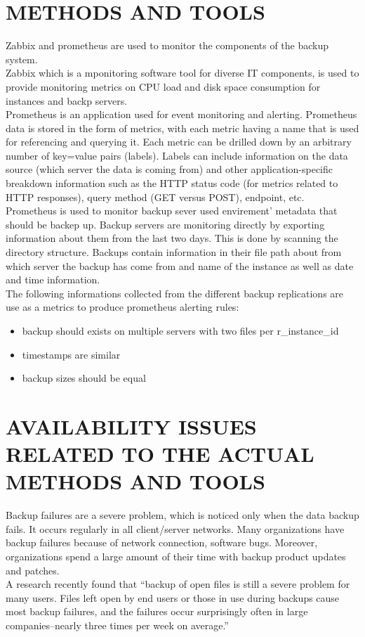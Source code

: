 \documentclass[english]{tktltiki2}
\theoremstyle{definition}
\theoremstyle{remark}
\begin{document}
\section{METHODS AND TOOLS}
Zabbix and prometheus are used to monitor the components of the backup system.\\
Zabbix \cite{10.5555/3074244} which  is a mponitoring software tool for diverse IT components,  is used to provide monitoring metrics on CPU load and disk space consumption for instances and backp servers.\\ 
Prometheus \cite{turnbull2018monitoring} is an application used for event monitoring and alerting.
Prometheus data is stored in the form of metrics, with each metric having a name that is used for referencing and querying it. Each metric can be drilled down by an arbitrary number of key=value pairs (labels). Labels can include information on the data source (which server the data is coming from) and other application-specific breakdown information such as the HTTP status code (for metrics related to HTTP responses), query method (GET versus POST), endpoint, etc. \\
Prometheus is used to monitor backup sever used envirement’ metadata that should  be backep up. Backup servers are monitoring directly by exporting information about  them from the last two days. This is done by scanning the directory structure. Backups contain information in their file path about from which server the backup has come from and name of the instance as well as date and time information.\\
The following informations collected from the different backup replications are use as a metrics to produce prometheus alerting rules:
\begin{itemize}
\item backup should exists on multiple servers with two files per r\_instance\_id
\item timestamps are similar
\item backup sizes should be equal
\end{itemize}


\section{AVAILABILITY ISSUES RELATED TO THE ACTUAL METHODS AND TOOLS}
 Backup failures are a severe problem, which is noticed only when the data backup fails. It occurs 
regularly in all client/server networks. Many organizations have backup failures because of network 
connection, software bugs. Moreover, organizations spend a large amount of their time with backup product updates and patches.\\
A research recently  found that “backup of open files is still a severe problem for many users. Files left open by end users or those in use during backups cause most backup failures, and the failures occur surprisingly often in large companies--nearly three times per week on average.”
\end{document}
